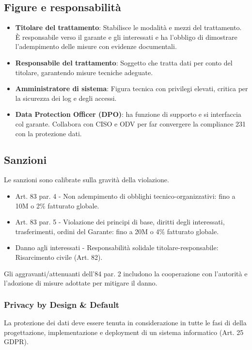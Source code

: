 \documentclass[11pt,a4paper]{article}
\begin{document}
\subsection{Figure e responsabilità}
\begin{itemize}
    \item \textbf{Titolare del trattamento}: Stabilisce le modalità e mezzi del trattamento. È responsabile verso il garante e gli interessati e ha l'obbligo di dimostrare l'adempimento delle misure con evidenze documentali.
    \item \textbf{Responsabile del trattamento}: Soggetto che tratta dati per conto del titolare, garantendo misure tecniche adeguate.
    \item \textbf{Amministratore di sistema}: Figura tecnica con privilegi elevati, critica per la sicurezza dei log e degli accessi.
    \item \textbf{Data Protection Officer (DPO)}: ha funzione di supporto e si interfaccia col garante. Collabora con CISO e ODV per far convergere la compliance 231 con la protezione dati.
\end{itemize}

\subsection{Sanzioni}
Le sanzioni sono calibrate sulla gravità della violazione.
\begin{itemize}
    \item Art. 83 par. 4 - Non adempimento di obblighi tecnico-organizzativi: fino a 10M o 2\% fatturato globale.
    \item Art. 83 par. 5 - Violazione dei principi di base, diritti degli interessati, trasferimenti, ordini del Garante: fino a 20M o 4\% fatturato globale.
    \item Danno agli interessati - Responsabilità solidale titolare-responsabile: Risarcimento civile (Art. 82).
\end{itemize}

Gli aggravanti/attenuanti dell'84 par. 2 includono la cooperazione con l'autorità e l'adozione di misure adottate per mitigare il danno.

\subsubsection{Privacy by Design \& Default}
La protezione dei dati deve essere tenuta in considerazione in tutte le fasi di della progettazione, implementazione e deployment di un sistema informatico (Art. 25 GDPR).
\end{document}
